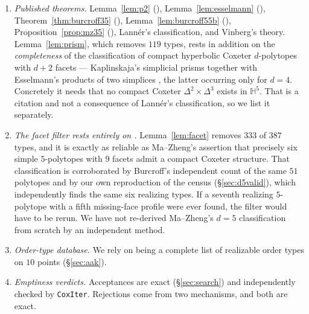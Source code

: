 \documentclass[11pt,reqno]{amsart}
\theoremstyle{plain}
\theoremstyle{definition}
\newcommand{\HH}{\mathbb{H}}
\newcommand{\NumTypes}{387}
\newcommand{\NumPrism}{119}
\begin{document}
\begin{enumerate}
\item\label{as:lit} \emph{Published theorems.} Lemma~\ref{lem:p2}
  (\cite{FeliksonTumarkin2009}), Lemma~\ref{lem:esselmann}
  (\cite[Lemma~6.7]{Esselmann1994}), Theorem~\ref{thm:burcroff35}
  (\cite[Thm.~3.5]{Burcroff2024}), Lemma~\ref{lem:burcroff55b}
  (\cite[Lemma~5.5(b)]{Burcroff2024}), Proposition~\ref{prop:mz35}
  (\cite[Prop.~3.5]{MaZheng2024}), Lann\'er's classification, and Vinberg's
  theory. Lemma~\ref{lem:prism}, which removes $\NumPrism$ types, rests in
  addition on the \emph{completeness} of the classification of compact hyperbolic
  Coxeter $d$-polytopes with $d+2$ facets --- Kaplinskaja's simplicial prisms
  \cite{Kaplinskaja1974} together with Esselmann's products of two simplices
  \cite{Esselmann1996}, the latter occurring only for $d=4$. Concretely it needs
  that no compact Coxeter $\Delta^2\times\Delta^3$ exists in $\HH^5$. That is a
  citation and not a consequence of Lann\'er's classification, so we list it
  separately.

\item\label{as:facet} \emph{The facet filter rests entirely on
  \cite{MaZheng2023}.} Lemma~\ref{lem:facet} removes $333$ of $\NumTypes$
  types, and it is exactly as reliable as Ma--Zheng's assertion that precisely
  six simple $5$-polytopes with $9$ facets admit a compact Coxeter structure.
  That classification is corroborated by Burcroff's independent count of the
  same $51$ polytopes and by our own reproduction of the census
  (\S\ref{sec:d5valid}), which independently finds the same six realizing
  types. If a seventh realizing $5$-polytope with a fifth missing-face profile
  were ever found, the filter would have to be rerun. We have not re-derived
  Ma--Zheng's $d=5$ classification from scratch by an independent method.

\item\label{as:db} \emph{Order-type database.} We rely on
  \cite{AichholzerAurenhammerKrasser2002,OrderTypeDB} being a complete list of
  realizable order types on $10$ points (\S\ref{sec:aak}).

\item\label{as:screen} \emph{Emptiness verdicts.} Acceptances are exact
  (\S\ref{sec:search}) and independently checked by \texttt{CoxIter}. Rejections
  come from two mechanisms, and both are exact.


\end{enumerate}
\end{document}
